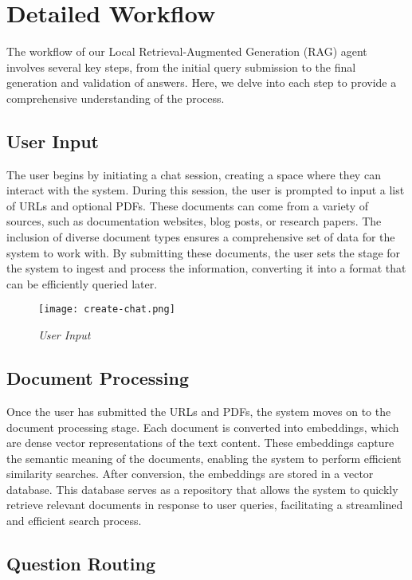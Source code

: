 \section{Detailed Workflow}

The workflow of our Local Retrieval-Augmented Generation (RAG) agent involves several key steps, from the initial query submission to the final generation and validation of answers. Here, we delve into each step to provide a comprehensive understanding of the process.

\subsection{User Input}

The user begins by initiating a chat session, creating a space where they can interact with the system. During this session, the user is prompted to input a list of URLs and optional PDFs. These documents can come from a variety of sources, such as documentation websites, blog posts, or research papers. The inclusion of diverse document types ensures a comprehensive set of data for the system to work with. By submitting these documents, the user sets the stage for the system to ingest and process the information, converting it into a format that can be efficiently queried later.

\begin{figure}[H]
    \centering
    \texttt{[image: create-chat.png]}
    \caption{
        \it{User Input}
    }
\end{figure}

\subsection{Document Processing}

Once the user has submitted the URLs and PDFs, the system moves on to the document processing stage. Each document is converted into embeddings, which are dense vector representations of the text content. These embeddings capture the semantic meaning of the documents, enabling the system to perform efficient similarity searches. After conversion, the embeddings are stored in a vector database. This database serves as a repository that allows the system to quickly retrieve relevant documents in response to user queries, facilitating a streamlined and efficient search process.

\subsection{Question Routing}

